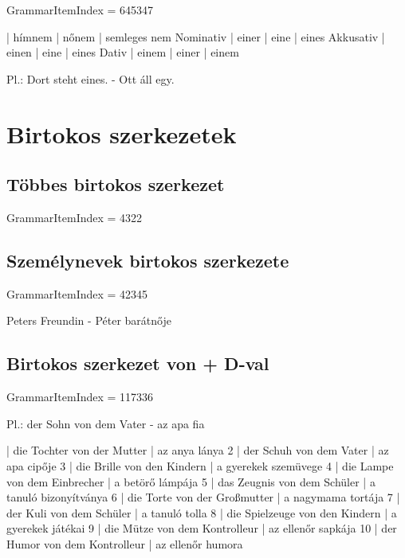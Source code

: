 \documentclass{article}
\newenvironment{desc}{\verbatim}{\endverbatim}
\newenvironment{exmp}{\verbatim}{\endverbatim}
\begin{document}
GrammarItemIndex = 645347

\begin{desc}
          | hímnem | nőnem | semleges nem 
Nominativ | einer  | eine  | eines 
Akkusativ | einen  | eine  | eines 
Dativ     | einem  | einer | einem 

Pl.: Dort steht eines. - Ott áll egy.
\end{desc}

\section{Birtokos szerkezetek}

\subsection{Többes birtokos szerkezet}

GrammarItemIndex = 4322

\subsection{Személynevek birtokos szerkezete}

GrammarItemIndex = 42345

\begin{desc}
Peters Freundin - Péter barátnője
\end{desc}

\subsection{Birtokos szerkezet von + D-val}

GrammarItemIndex = 117336

\begin{desc}
Pl.: der Sohn von dem Vater - az apa fia
\end{desc}

\begin{exmp}
1 | die Tochter von der Mutter | az anya lánya
2 | der Schuh von dem Vater | az apa cipője
3 | die Brille von den Kindern | a gyerekek szemüvege
4 | die Lampe von dem Einbrecher | a betörő lámpája
5 | das Zeugnis von dem Schüler | a tanuló bizonyítványa
6 | die Torte von der Großmutter | a nagymama tortája
7 | der Kuli von dem Schüler | a tanuló tolla
8 | die Spielzeuge von den Kindern | a gyerekek játékai
9 | die Mütze von dem Kontrolleur | az ellenőr sapkája
10 | der Humor von dem Kontrolleur | az ellenőr humora
\end{exmp}
\end{document}
